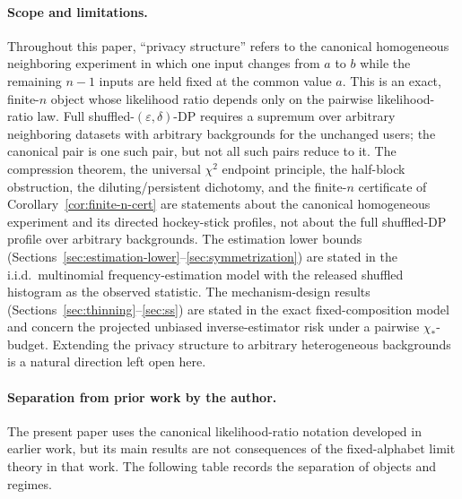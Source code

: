 \documentclass[11pt]{amsart}
\numberwithin{equation}{section}
\theoremstyle{definition}
\begin{document}
\paragraph{Scope and limitations.}
Throughout this paper, ``privacy structure'' refers to the canonical homogeneous neighboring
experiment in which one input changes from $a$ to $b$ while the remaining $n-1$ inputs are held
fixed at the common value $a$.  This is an exact, finite-$n$ object whose likelihood ratio depends
only on the pairwise likelihood-ratio law.  Full shuffled-$(\varepsilon,\delta)$-DP requires a
supremum over arbitrary neighboring datasets with arbitrary backgrounds for the unchanged users;
the canonical pair is one such pair, but not all such pairs reduce to it.  The compression
theorem, the universal $\chi^2$ endpoint principle, the half-block obstruction, the
diluting/persistent dichotomy, and the finite-$n$ certificate of
Corollary~\ref{cor:finite-n-cert} are statements about the canonical homogeneous experiment and
its directed hockey-stick profiles, not about the full shuffled-DP profile over arbitrary
backgrounds.  The estimation lower bounds (Sections~\ref{sec:estimation-lower}--\ref{sec:symmetrization})
are stated in the i.i.d.\ multinomial frequency-estimation model with the released shuffled
histogram as the observed statistic.  The mechanism-design results
(Sections~\ref{sec:thinning}--\ref{sec:ss}) are stated in the exact fixed-composition model and
concern the projected unbiased inverse-estimator risk under a pairwise $\chi_\ast$-budget.
Extending the privacy structure to arbitrary heterogeneous backgrounds is a natural direction left
open here.

\paragraph{Separation from prior work by the author.}
The present paper uses the canonical likelihood-ratio notation developed in earlier work, but its
main results are not consequences of the fixed-alphabet limit theory in that work.  The following
table records the separation of objects and regimes.
\end{document}
